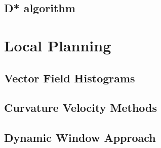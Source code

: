 \begin{figure}[H]
     \centering
     \hfill
     \hfill
     \caption{}
     \label{a_sol}
\end{figure}
\newpage
\subsection{D* algorithm}
\newpage

\section{Local Planning}
\subsection{Vector Field Histograms}
\newpage
\subsection{Curvature Velocity Methods}
\newpage
\subsection{Dynamic Window Approach}
\newpage
